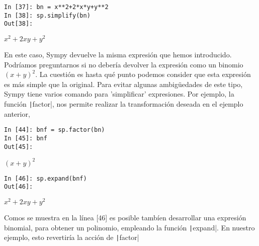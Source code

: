 \begin{center}
	\begin{minipage}{.25\textwidth}
		\begin{verbatim}
In [37]: bn = x**2+2*x*y+y**2
In [38]: sp.simplify(bn)
Out[38]:
		\end{verbatim}
		$x^2+2xy+y^2$
	\end{minipage}
\end{center}
\begin{paracol}{2}
En este caso, Sympy devuelve la misma expresión que hemos introducido. Podríamos preguntarnos si no debería devolver la expresión como un binomio $(x+y)^2$. La cuestión es hasta qué punto podemos consider que esta expresión es más simple que la original. Para evitar algunas ambigüedades de este tipo, Sympy tiene varios comando para 'simplificar' expresiones. Por ejemplo, la función \texttt|factor|, nos permite realizar la transformación deseada en el ejemplo anterior,
\end{paracol}
\begin{center}
	\begin{minipage}{.25\textwidth}
\begin{verbatim}
In [44]: bnf = sp.factor(bn)
In [45]: bnf
Out[45]:
\end{verbatim}
$(x+y)^2$

\begin{verbatim}
In [46]: sp.expand(bnf)
Out[46]:
\end{verbatim}
$x^2+2xy+y^2$
\end{minipage}
\end{center}
\begin{paracol}{2}
Comos se muestra en la línea [46] es posible tambíen desarrollar una expresión binomial, para obtener un polinomio, empleando la función \texttt|expand|. En nuestro ejemplo, esto revertiría la acción de \texttt|factor|
\end{paracol}

